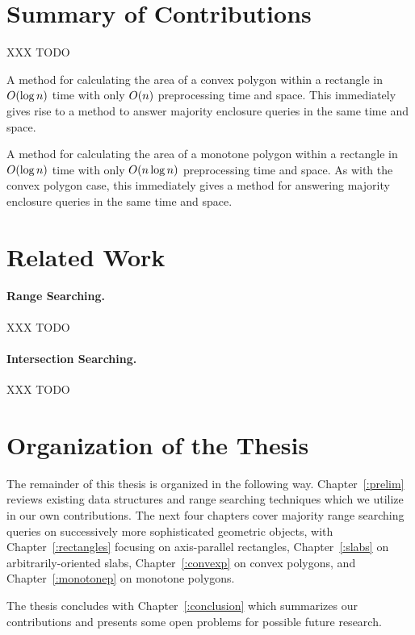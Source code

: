 \section{Summary of Contributions}
\label{:introduction:contributions}

XXX TODO

A method for calculating the area of a convex polygon within a rectangle in $O\!\left(\log{n}\right)$ time with only
$O\!\left(n\right)$ preprocessing time and space. This immediately gives rise to a method to answer majority enclosure queries in the same time and space.

A method for calculating the area of a monotone polygon within a rectangle in $O\!\left(\log{n}\right)$ time with only
$O\!\left(n \log{n}\right)$ preprocessing time and space. As with the convex polygon case, this immediately gives a method for answering majority enclosure queries in the same time and space.



\section{Related Work}
\label{:intro:related}

\paragraph{Range Searching.} 
XXX TODO

\paragraph{Intersection Searching.} 
XXX TODO


\section{Organization of the Thesis}
\label{:introduction:organization}

The remainder of this thesis is organized in the following way. 
Chapter~\ref{:prelim} reviews existing data structures and range searching techniques which we utilize in our own contributions.
The next four chapters cover majority range searching queries on successively more sophisticated geometric objects, with Chapter~\ref{:rectangles} focusing on axis-parallel rectangles, Chapter~\ref{:slabs} on arbitrarily-oriented slabs, Chapter~\ref{:convexp} on convex polygons, and Chapter~\ref{:monotonep} on monotone polygons.

The thesis concludes with Chapter~\ref{:conclusion} which summarizes our contributions and presents some open problems for possible future research.



